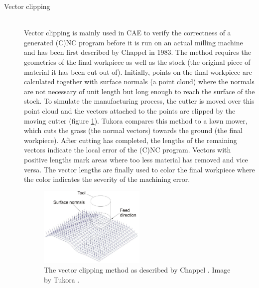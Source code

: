 \begin{description}
	\item[Vector clipping] \hfill \\
	Vector clipping is mainly used in CAE to verify the correctness of a generated (C)NC program before it is run on an actual milling machine and has been first described by Chappel \cite{vector_clipping} in 1983.
	The method requires the geometries of the final workpiece as well as the stock (\ie the original piece of material it has been cut out of).
	Initially, points on the final workpiece are calculated together with surface normals (\ie a point cloud) where the normals are not necessary of unit length but long enough to reach the surface of the stock.
	To simulate the manufacturing process, the cutter is moved over this point cloud and the vectors attached to the points are clipped by the moving cutter (\cf figure \ref{fig:vector_clipping}).
	Tukora compares this method to a lawn mower, which cuts the grass (\ie the normal vectors) towards the ground (\ie the final workpiece).
	After cutting has completed, the lengths of the remaining vectors indicate the local error of the (C)NC program.
	Vectors with positive lengths mark areas where too less material has removed and vice versa.
	The vector lengths are finally used to color the final workpiece where the color indicates the severity of the machining error. 
	
	\begin{figure}[h]
		\centering
		\includegraphics[width=0.5\textwidth]{images/vector_clipping}
		\caption{
			The vector clipping method as described by Chappel \cite{vector_clipping}.
			Image by Tukora \cite{virtual_machining_review}.
		}
		\label{fig:vector_clipping}
	\end{figure}
	 

\end{description}
